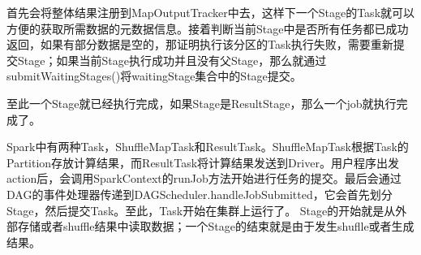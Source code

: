 首先会将整体结果注册到MapOutputTracker中去，这样下一个Stage的Task就可以方便的获取所需数据的元数据信息。接着判断当前Stage中是否所有任务都已成功返回，如果有部分数据是空的，那证明执行该分区的Task执行失败，需要重新提交Stage；如果当前Stage执行成功并且没有父Stage，那么就通过submitWaitingStages()将waitingStage集合中的Stage提交。

至此一个Stage就已经执行完成，如果Stage是ResultStage，那么一个job就执行完成了。

Spark中有两种Task，ShuffleMapTask和ResultTask。ShuffleMapTask根据Task的Partition存放计算结果，而ResultTask将计算结果发送到Driver。用户程序出发action后，会调用SparkContext的runJob方法开始进行任务的提交。最后会通过DAG的事件处理器传递到DAGScheduler.handleJobSubmitted，它会首先划分Stage，然后提交Task。至此，Task开始在集群上运行了。
Stage的开始就是从外部存储或者shuffle结果中读取数据；一个Stage的结束就是由于发生shuflle或者生成结果。

